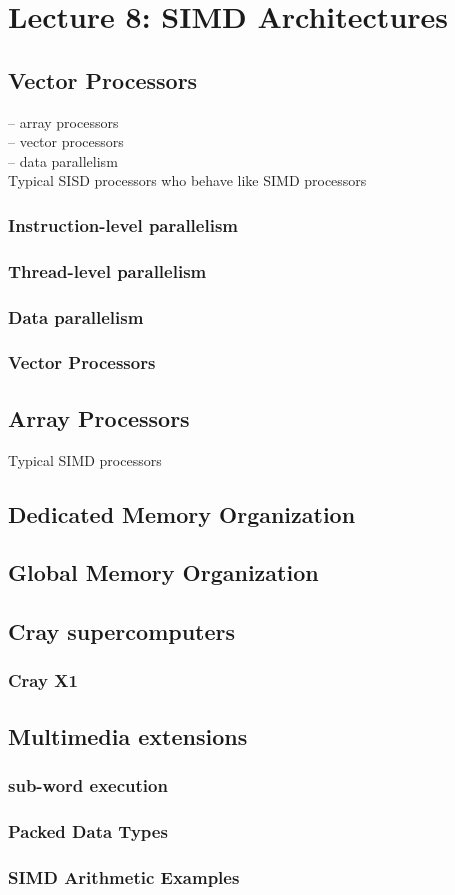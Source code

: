 \section{Lecture 8: SIMD Architectures}

\subsection{Vector Processors}
-- array processors \\
-- vector processors \\
-- data parallelism \\
Typical SISD processors who behave like SIMD processors

\subsubsection{Instruction-level parallelism}
\subsubsection{Thread-level parallelism}
\subsubsection{Data parallelism}
\subsubsection{Vector Processors}
\subsection{Array Processors}
Typical SIMD processors

\subsection{Dedicated Memory Organization}
\subsection{Global Memory Organization}
\subsection{Cray supercomputers}
\subsubsection{Cray X1}
\subsection{Multimedia extensions}
\subsubsection{sub-word execution}
\subsubsection{Packed Data Types}
\subsubsection{SIMD Arithmetic Examples}
